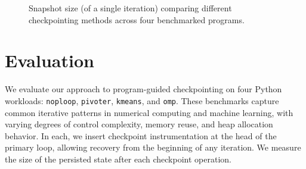 
\begin{figure*}[t]
    \centering
  \else
    
  \fi
  \caption{Snapshot size (of a single iteration) comparing different checkpointing methods across four benchmarked programs.}
\end{figure*}

\section{Evaluation}
\label{sec:evaluation}
We evaluate our approach to program-guided checkpointing on four Python workloads: \texttt{noploop}, \texttt{pivoter}, \texttt{kmeans}, and \texttt{omp}. These benchmarks capture common iterative patterns in numerical computing and machine learning, with varying degrees of control complexity, memory reuse, and heap allocation behavior. In each, we insert checkpoint instrumentation at the head of the primary loop, allowing recovery from the beginning of any iteration. We measure the size of the persisted state after each checkpoint operation.

